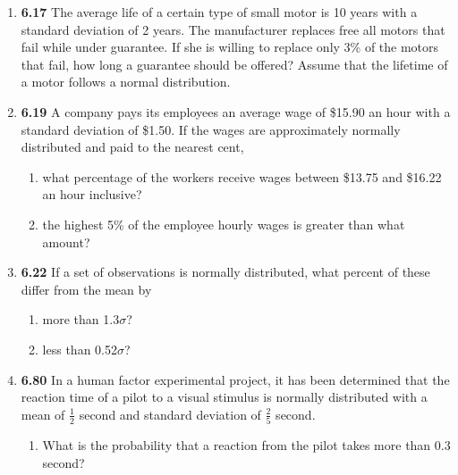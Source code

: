 \documentclass[basic, header]{nosvagor-notes}
\begin{document}
\begin{enumerate}[itemsep=4em]
  \item \textbf{6.17} The average life of a certain type of small motor is 10 years with
    a standard deviation of 2 years. The manufacturer replaces free all motors
    that fail while under guarantee. If she is willing to replace only 3\% of
    the motors that fail, how long a guarantee should be offered? Assume that
    the lifetime of a motor follows a normal distribution.

  \item \textbf{6.19} A company pays its employees an average wage of \$15.90 an hour
    with a standard deviation of \$1.50. If the wages are approximately normally
    distributed and paid to the nearest cent,
    \begin{enumerate}

      \item what percentage of the workers receive wages between \$13.75 and \$16.22 an hour inclusive?

      \item the highest 5\% of the employee hourly wages is greater than what amount?

    \end{enumerate}

  \item \textbf{6.22} If a set of observations is normally distributed, what
    percent of these differ from the mean by
    \begin{enumerate}

      \item more than 1.3\(\sigma\)?

      \item less than 0.52\(\sigma\)?

    \end{enumerate}

  \newpage %

  \item \textbf{6.80} In a human factor experimental project, it has been
    determined that the reaction time of a pilot to a visual stimulus is
    normally distributed with a mean of \(\frac{1}{2}\) second and standard
    deviation of \(\frac{2}{5}\) second.
    \begin{enumerate}

      \item  What is the probability that a reaction from the pilot takes more
        than 0.3 second?


\end{enumerate}
\end{enumerate}
\end{document}
